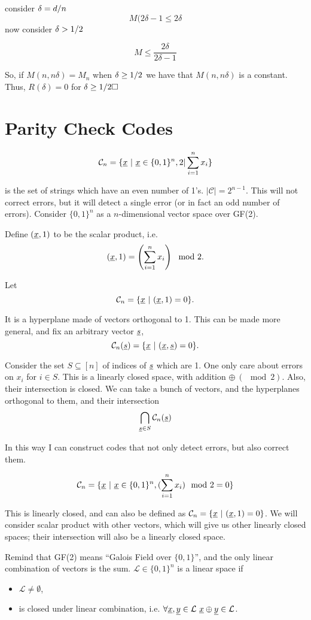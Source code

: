 consider $\delta = {d}/{n}$
\[
 M(2\delta -1 \leq 2\delta
\]
now consider $\delta > {1}/{2}$

\[
 M \leq \dfrac{2\delta}{2\delta-1}
\]

So, if $M(n, n\delta) = M_n$ when $\delta \geq {1}/{2}$ we have that $M(n, n\delta)$ is a constant. Thus, $R(\delta) = 0$ for $\delta \geq \ifrac{1}{2} \hfill\Box$ 

\section{Parity Check Codes}

\[
 \mathcal{C}_n = \{\underline{x}\ |\ \underline{x} \in \{0, 1\}^n, 2|\sum_{i=1}^n x_i\}
\]

is the set of strings which have an even number of 1's. $|\mathcal{C}| = 2^{n-1}$. This will not correct errors, but it will detect a single error (or in fact an odd number of errors). Consider $\{0, 1\}^n$ as a $n$-dimensional vector space over GF(2).

Define $(\underline{x}, 1)$ to be the scalar product, i.e.
\[
 (\underline{x}, 1) = \left(\sum_{i=1}^n x_i\right) \mod 2.
\]

Let 
\[
 \mathcal{C}_n = \{\str{x}\ |\ (\str{x}, 1) = 0\}.
\]

It is a hyperplane made of vectors orthogonal to 1. This can be made more general, and fix an arbitrary vector $\underline{s}$,
\[
 \mathcal{C}_n(\underline{s}) = \{\underline{x}\ |\ (\underline{x}, \underline{s}) = 0\}.
\]

Consider the set $S \subseteq [n]$ of indices of $\underline{s}$ which are 1. One only care about errors on $x_i$ for $i \in S$. This is a linearly closed space, with addition $\oplus\ (\mod 2)$. Also, their intersection is closed. We can take a bunch of vectors, and the hyperplanes orthogonal to them, and their intersection
\[
 \bigcap_{\underline{s} \in S} \mathcal{C}_n(\underline{s})
\]

In this way I can construct codes that not only detect errors, but also correct them.

\[
\mathcal{C}_n = \{\underline{x}\ |\ \underline{x} \in \{0, 1\}^n, (\sum_{i=1}^n x_i)\mod 2 = 0\}
\]

This is linearly closed, and can also be defined as $\mathcal{C}_n = \{\underline{x}\ |\ (\underline{x}, 1) = 0\}$. We will consider scalar product with other vectors, which will give us other linearly closed spaces; their intersection will also be a linearly closed space.

Remind that GF(2) means ``Galois Field over $\{0, 1\}$'', and the only linear combination of vectors is the sum. $\mathcal{L} \in \{0,1\}^n$ is a linear space if
\begin{itemize}
	\item $\mathcal{L} \not= \emptyset$,
	\item is closed under linear combination, i.e. $\forall \underline{x},\underline{y} \in \mathcal{L}\ \underline{x} \oplus \underline{y} \in \mathcal{L}$.
\end{itemize}

